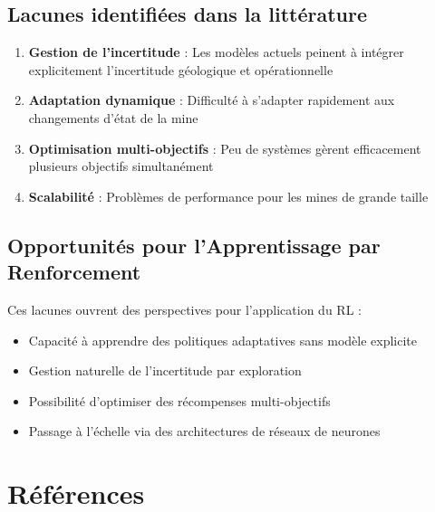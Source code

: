 \documentclass[12pt,a4paper]{article}
\begin{document}
\subsection{Lacunes identifiées dans la littérature}

\begin{enumerate}
    \item \textbf{Gestion de l'incertitude} : Les modèles actuels peinent à intégrer explicitement l'incertitude géologique et opérationnelle
    \item \textbf{Adaptation dynamique} : Difficulté à s'adapter rapidement aux changements d'état de la mine
    \item \textbf{Optimisation multi-objectifs} : Peu de systèmes gèrent efficacement plusieurs objectifs simultanément
    \item \textbf{Scalabilité} : Problèmes de performance pour les mines de grande taille
\end{enumerate}

\subsection{Opportunités pour l'Apprentissage par Renforcement}

Ces lacunes ouvrent des perspectives pour l'application du RL :
\begin{itemize}
    \item Capacité à apprendre des politiques adaptatives sans modèle explicite
    \item Gestion naturelle de l'incertitude par exploration
    \item Possibilité d'optimiser des récompenses multi-objectifs
    \item Passage à l'échelle via des architectures de réseaux de neurones
\end{itemize}

\section*{Références}
\end{document}
